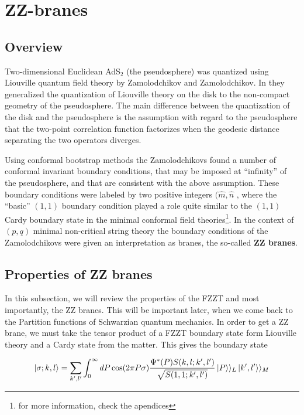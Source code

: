 \chapter{ZZ-branes}
\adjustmtc
\minitoc
\section{Overview}
Two-dimensional Euclidean AdS$_2$ (the pseudosphere) was quantized using Liouville quantum field theory by Zamolodchikov
and Zamolodchikov. In \cite{Zamolodchikov01} they generalized the quantization
of Liouville theory on the disk \cite{Fateev00} to the non-compact
geometry of the pseudosphere. The main difference between the
quantization of the disk and the pseudosphere is the assumption
with regard to the pseudosphere that the two-point correlation
function factorizes when the geodesic distance separating the
two operators diverges\cite{Gesser08}.
\par
Using conformal bootstrap methods the Zamolodchikovs
found a number of conformal invariant boundary conditions,
that may be imposed at “infinity” of the pseudosphere, and that
are consistent with the above assumption. These boundary conditions
were labeled by two positive integers $(\hat{m},\hat{n}$ , where the
“basic” $(1,1)$ boundary condition played a role quite similar to
the $(1, 1)$ Cardy boundary state in the minimal conformal field
theories\footnote{for more information, check the apendices}. In the context of $(p,q)$ minimal non-critical string theory the boundary conditions of the Zamolodchikovs were given an interpretation as branes, the so-called \textbf{ZZ branes}\cite{Shih04}.

\section{Properties of ZZ branes}
In this subsection, we will review the properties of the FZZT and most importantly, the ZZ branes. This will be important later, when we come back to the Partition functions of Schwarzian quantum mechanics. In order to get a ZZ brane, we must take the tensor product of a FZZT boundary state form Liouville theory and a Cardy state from the matter. This gives the boundary state\cite{Fateev00}

\begin{equation}
\ket{\sigma;k, l} = \sum_{k',l'}{\int_0^\infty{dP \cos(2\pi P\sigma)\frac{\Psi^*(P)S(k,l;k',l')}{\sqrt{S(1,1;k',l')}}}\ket{P}\rangle_L\ket{k',l'}\rangle_M}
\end{equation}

